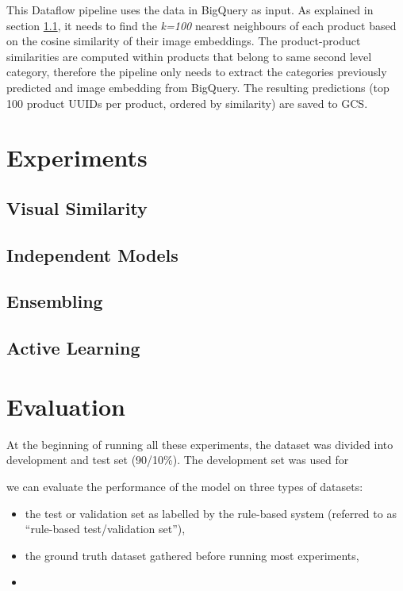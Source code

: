 
This Dataflow pipeline uses the data in BigQuery as input.
As explained in section \ref{exp_sim}, it needs to find the \textit{k=100} nearest neighbours of each product based on the cosine similarity of their image embeddings.
The product-product  similarities are computed within products that belong to same second level category,  therefore the pipeline only needs to extract  the categories previously predicted and image embedding from BigQuery.
The resulting predictions (top 100 product UUIDs per product, ordered by  similarity)  are saved to GCS.

\section{Experiments}

\subsection{Visual Similarity}
\label{exp_sim}


\subsection{Independent Models}
\label{exp_models}

\subsection{Ensembling}
\label{exp_ensembling}

\subsection{Active Learning}
\label{exp_al}


\section{Evaluation}
\label{evaluation}

At the beginning of running all these experiments, the dataset was divided into development and test set (90/10\%).
The development set was used for


 we can evaluate the performance of the model on three types of datasets:

\begin{itemize}
  \item the test or validation set as labelled by the rule-based system (referred to as ``rule-based test/validation set''),
  \item the ground truth dataset gathered  before running most experiments,
  \item
\end{itemize}
